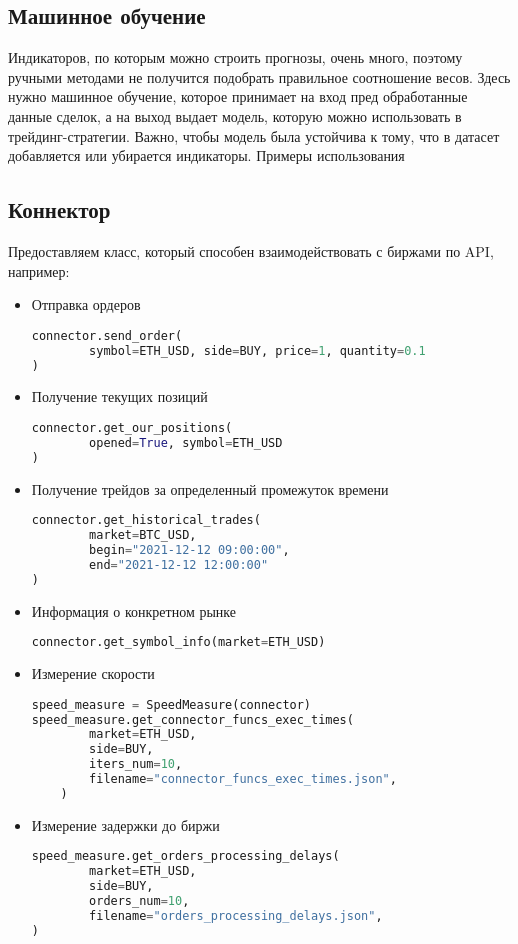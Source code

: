 \documentclass{article}
\begin{document}
\subsection{Машинное обучение}
Индикаторов, по которым можно строить прогнозы, очень много, поэтому ручными методами не получится подобрать правильное соотношение весов. Здесь нужно машинное обучение, которое принимает на вход пред обработанные данные сделок, а на выход выдает модель, которую можно использовать в трейдинг-стратегии. Важно, чтобы модель была устойчива к тому, что в датасет добавляется или убирается индикаторы.
Примеры использования

\subsection{Коннектор}
Предоставляем класс, который способен взаимодействовать с биржами по API, например:

\begin{itemize}

\item Отправка ордеров
\begin{lstlisting}[language=Python]
connector.send_order(
        symbol=ETH_USD, side=BUY, price=1, quantity=0.1
)
\end{lstlisting}

\item Получение текущих позиций
\begin{lstlisting}[language=Python]
connector.get_our_positions(
        opened=True, symbol=ETH_USD
)
\end{lstlisting}

\item Получение трейдов за определенный промежуток времени
\begin{lstlisting}[language=Python]
connector.get_historical_trades(
        market=BTC_USD,
        begin="2021-12-12 09:00:00",
        end="2021-12-12 12:00:00"
)
\end{lstlisting}

\item Информация о конкретном рынке
\begin{lstlisting}[language=Python]
connector.get_symbol_info(market=ETH_USD)
\end{lstlisting}

\item Измерение скорости
\begin{lstlisting}[language=Python]
speed_measure = SpeedMeasure(connector)
speed_measure.get_connector_funcs_exec_times(
        market=ETH_USD,
        side=BUY,
        iters_num=10,
        filename="connector_funcs_exec_times.json",
    )
\end{lstlisting}

\item Измерение задержки до биржи
\begin{lstlisting}[language=Python]
speed_measure.get_orders_processing_delays(
        market=ETH_USD,
        side=BUY,
        orders_num=10,
        filename="orders_processing_delays.json",
)
\end{lstlisting}

\end{itemize}
\end{document}
